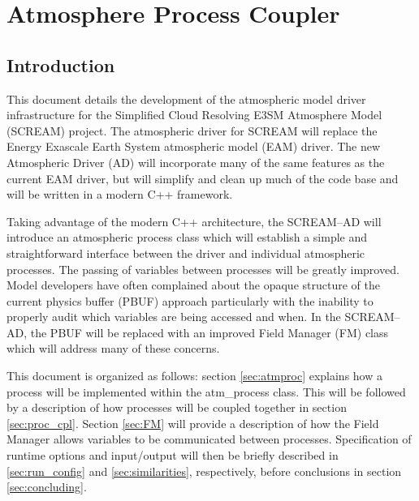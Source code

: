 \section{Atmosphere Process Coupler}
\subsection{Introduction}

This document details the development of the atmospheric model driver infrastructure for the Simplified Cloud Resolving E3SM Atmosphere Model (SCREAM) project.  The atmospheric driver for SCREAM will replace the Energy Exascale Earth System atmospheric model (EAM) driver.  The new Atmospheric Driver (AD) will incorporate many of the same features as the current EAM driver, but will simplify and clean up much of the code base and will be written in a modern C++ framework.

Taking advantage of the modern C++ architecture, the SCREAM--AD will introduce an atmospheric process class which will establish a simple and straightforward interface between the driver and individual atmospheric processes.  The passing of variables between processes will be greatly improved.  Model developers have often complained about the opaque structure of the current physics buffer (PBUF) approach particularly with the inability to properly audit which variables are being accessed and when.  In the SCREAM--AD, the PBUF will be replaced with an improved Field Manager (FM) class which will address many of these concerns.

This document is organized as follows: section \ref{sec:atmproc} explains how a process will be implemented within the atm\_process class. This will be followed by a description of how processes will be coupled together in section \ref{sec:proc_cpl}. Section \ref{sec:FM} will provide a description of how the Field Manager allows variables to be communicated between processes. Specification of runtime options and input/output will then be briefly described in \ref{sec:run_config} and \ref{sec:similarities}, respectively, before conclusions in section \ref{sec:concluding}.

